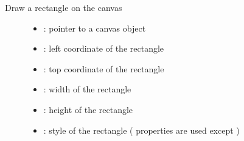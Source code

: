 \documentclass[letterpaper,10pt,english]{sphinxmanual}
\begin{document}
\begin{fulllineitems}
\label{\detokenize{object-types/canvas:_CPPv419lv_canvas_draw_rectP8lv_obj_t10lv_coord_t10lv_coord_t10lv_coord_t10lv_coord_tPK10lv_style_t}}%
\pysigstartmultiline
{}\label{\detokenize{object-types/canvas:lv__canvas_8h_1aeb22e0a2d51e4ae7b61f8655a80d64d7}}%
\pysigstopmultiline
Draw a rectangle on the canvas \begin{description}
\item[{}] \leavevmode\begin{itemize}
\item {} 
: pointer to a canvas object 

\item {} 
: left coordinate of the rectangle 

\item {} 
: top coordinate of the rectangle 

\item {} 
: width of the rectangle 

\item {} 
: height of the rectangle 

\item {} 
: style of the rectangle ( properties are used except ) 

\end{itemize}

\end{description}


\end{fulllineitems}

\end{document}
